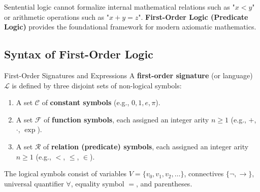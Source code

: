 Sentential logic cannot formalize internal mathematical relations such as "$x < y$" or arithmetic operations such as "$x + y = z$". \textbf{First-Order Logic (Predicate Logic)} provides the foundational framework for modern axiomatic mathematics.

\subsection{Syntax of First-Order Logic}

\begin{definitionbox}{First-Order Signatures and Expressions}
A \textbf{first-order signature} (or language) $\mathcal{L}$ is defined by three disjoint sets of non-logical symbols:
\begin{enumerate}[leftmargin=1.4em,itemsep=2pt]
  \item A set $\mathcal{C}$ of \textbf{constant symbols} (e.g., $0, 1, e, \pi$).
  \item A set $\mathcal{F}$ of \textbf{function symbols}, each assigned an integer arity $n \ge 1$ (e.g., $+$, $\cdot$, $\exp$).
  \item A set $\mathcal{R}$ of \textbf{relation (predicate) symbols}, each assigned an integer arity $n \ge 1$ (e.g., $<$, $\le$, $\in$).
\end{enumerate}
The logical symbols consist of variables $V = \{v_0, v_1, v_2, \dots\}$, connectives $\{\neg, \to\}$, universal quantifier $\forall$, equality symbol $=$, and parentheses.
\end{definitionbox}

